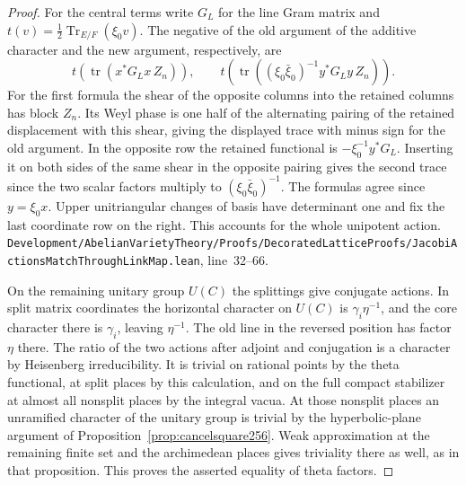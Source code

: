 \documentclass[a4paper,11pt]{article}
\theoremstyle{definition}
\theoremstyle{remark}
\newcommand{\srcloc}[2]{{\small\nolinkurl{#1.lean}}, line~#2}
\numberwithin{equation}{section}
\begin{document}
\begin{proof}
For the central terms write \(G_L\) for the line Gram matrix
and \(t(v)=\tfrac12\operatorname{Tr}_{E/F}(\xi_0 v)\).
The negative of the old argument of the additive character
and the new argument, respectively, are
\[
    t\!\left(\operatorname{tr}(x^*G_Lx\,Z_n)\right),\qquad
    t\!\left(\operatorname{tr}
      ((\xi_0\bar\xi_0)^{-1}y^*G_Ly\,Z_n)\right).
\]
For the first formula the shear of the opposite columns into
the retained columns has block \(Z_n\). Its Weyl phase is one
half of the alternating pairing of the retained displacement
with this shear, giving the displayed trace with minus sign
for the old argument. In the opposite row the retained
functional is \(-\xi_0^{-1}y^*G_L\). Inserting it on both
sides of the same shear in the opposite pairing gives the
second trace since the two scalar factors multiply to
\((\xi_0\bar\xi_0)^{-1}\). The formulas agree since
\(y=\xi_0x\). Upper unitriangular changes of basis have
determinant one and fix the last coordinate row on the
right. This accounts for the whole unipotent action.
\srcloc{Development/AbelianVarietyTheory/Proofs/DecoratedLatticeProofs/JacobiActionsMatchThroughLinkMap}{32--66}.

On the remaining unitary group \(U(C)\) the splittings give
conjugate actions. In split matrix coordinates the horizontal
character on \(U(C)\) is \(\gamma_i\eta^{-1}\), and the core
character there is \(\gamma_i\), leaving \(\eta^{-1}\). The old
line in the reversed position has factor \(\eta\) there. The
ratio of the two actions after adjoint and conjugation is a
character by Heisenberg irreducibility. It is trivial on
rational points by the theta functional, at split places by
this calculation, and on the full compact stabilizer at almost
all nonsplit places by the integral vacua. At those nonsplit
places an unramified character of the unitary group is trivial
by the hyperbolic-plane argument of
Proposition~\ref{prop:cancelsquare256}. Weak approximation at
the remaining finite set and the archimedean places gives
triviality there as well, as in that proposition. This proves
the asserted equality of theta factors.


\end{proof}
\end{document}
